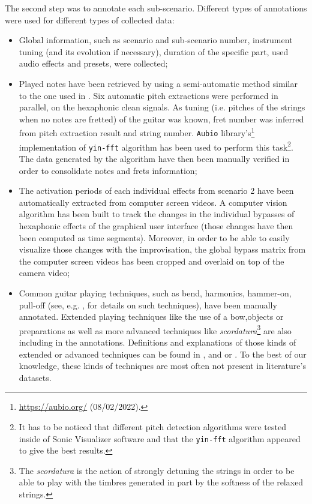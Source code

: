 \documentclass{article}
\begin{document}
The second step was to annotate each sub-scenario. Different types of annotations were used for different types of collected data: 
\begin{itemize}
\item Global information, such as scenario and sub-scenario number, instrument tuning (and its evolution if necessary), duration of the specific part, used audio effects and presets, were collected;

\item Played notes have been retrieved by using a semi-automatic method similar to the one used in \cite{sci:Xi2018}. Six automatic pitch extractions were performed in parallel, on the hexaphonic clean signals. As tuning (i.e. pitches of the strings when no notes are fretted) of the guitar was known, fret number was inferred from pitch extraction result and string number.  \texttt{Aubio} library's\footnote{\url{https://aubio.org/} (08/02/2022).} implementation of \texttt{yin-fft} algorithm \cite{sci:Brossier_yinFFT} has been used to perform this task\footnote{It has to be noticed that different pitch detection algorithms were tested inside of Sonic Visualizer software and that the \texttt{yin-fft} algorithm appeared to give the best results. }. The data generated by the algorithm have then been manually verified in order to consolidate notes and frets information; 

\item The activation periods of each individual effects from scenario 2 have been automatically extracted from computer screen videos. A computer vision algorithm has been built to track the changes in the individual bypasses of hexaphonic effects of the graphical user interface (those changes have then been computed as time segments). Moreover, in order to be able to easily visualize those changes with the improvisation, the global bypass matrix from the computer screen videos has been cropped and overlaid on top of the camera video; %

\item Common guitar playing techniques, such as bend, harmonics, hammer-on, pull-off (see, e.g. \cite{sci:Su2014a}, for details on such techniques), have been manually annotated. Extended playing techniques like the use of a bow,objects or preparations as well as more advanced techniques like \textit{scordatura}\footnote{The \textit{scordatura} is the action of strongly detuning the strings in order to be able to play with
the timbres generated in part by the softness of the relaxed strings.} are also including in the annotations. Definitions and explanations of those kinds of extended or advanced techniques can be found in \cite{Josel2014},  \cite{organo:schndeider2015_microtones} and \cite{organo:Landman2012} or \cite{organo:ElgartYates1990}. To the best of our knowledge, these kinds of techniques are most often not present in literature's datasets.
\end{itemize}
\end{document}
